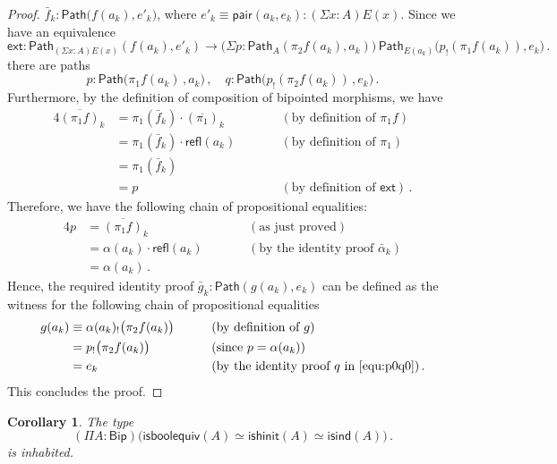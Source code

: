 \documentclass[10pt,a4paper,oneside,reqno]{amsart}
\numberwithin{equation}{section}
\theoremstyle{mythm}
\newtheorem{corollary}[theorem]{Corollary}
\theoremstyle{mydef}
\theoremstyle{myrmk}
\newcommand{\deq}{\equiv}
\newcommand{\peq}{=}
\newcommand{\co}{\colon}
\newcommand{\ext}{\mathsf{ext}}
\newcommand{\ct}{\cdot}
\newcommand{\pair}{\mathsf{pair}}
\newcommand{\Id}{\mathsf{Path}}
\newcommand{\refl}{\mathsf{refl}}
\newcommand{\Bip}{\mathsf{Bip}}
\newcommand{\ishinit}{\mathsf{ishinit}}
\newcommand{\isind}{\mathsf{isind}}
\begin{document}
\begin{proof}
$\bar{f}_k \co \Id \big( f(a_k),  e'_k\big)$, where $e'_k \equiv \pair(a_k, e_k) \co (\Sigma x :A ) E(x)$. Since we have an equivalence
\[
\ext \co \Id_{(\Sigma x : A) E(x)}( f(a_k), e'_k) \to \big( \Sigma p \co \Id_A( \pi_2 f(a_k), a_k) \big) \, \Id_{E(a_k)} \big( p_{!}( \pi_1 f(a_k)) , e_k \big) \, .
\]
there are paths 
\begin{equation}
\label{equ:p0q0}
p \co \Id \big( \pi_1 f (a_k) \, , a_k \big) \, , \quad q \co \Id \big( p_{!}( \pi_2 f (a_k)) \, , e_k \big)  \, .
\end{equation}
Furthermore, by the definition of composition of bipointed morphisms, we have
\begin{alignat*}{4}  
\overline{(\pi_1 f)}_k  & = \pi_1(\bar{f}_k) \ct (\overline{\pi_1})_k & & \qquad (\text{by definition of } \pi_1 f)   \\
& = \pi_1(\bar{f}_k) \ct \refl(a_k) & & \qquad (\text{by definition of } \pi_1)  \\
 & = \pi_1(\bar{f}_k) & & \qquad \\
 & = p  & & \qquad (\text{by definition of } \ext) \,  .
\end{alignat*}
Therefore, we have the following chain of propositional equalities:
\begin{alignat*}{4}
p & =  \overline{(\pi_1 f)}_k & &  \qquad (\text{as just proved})  \\
  & =  \alpha(a_k) \ct \refl(a_k) & &  \qquad (\text{by the identity proof } \bar{\alpha}_k ) \\ 
  & =  \alpha(a_k) \, .
\end{alignat*} 
Hence,  the required identity proof $\bar{g}_k \co \Id( g(a_k), e_k)$ can be defined as the witness for the following chain of propositional equalities
\begin{alignat*}{4}
g(a_k) & \deq \alpha(a_k)_{!} \big( \pi_2 f(a_k)  \big) & & \qquad (\text{by definition of } g) \\
 &              \peq   p_{!} \big( \pi_2 f(a_k)  \big) & & \qquad (\text{since } p = \alpha(a_k)) \\
   &            \peq  e_k  & &  \qquad (\text{by the identity proof } q \text{ in } \eqref{equ:p0q0})  \, .
   \end{alignat*} 
   This concludes the proof.
\end{proof}





\begin{corollary} \label{lem:BoolMainInternal} 
The type
\[
(\Pi A \co \Bip) \big( \mathsf{isboolequiv}(A) \simeq  \ishinit(A) \simeq \isind(A)  \big) \, .
\]
is inhabited.
\end{corollary}
\end{document}
